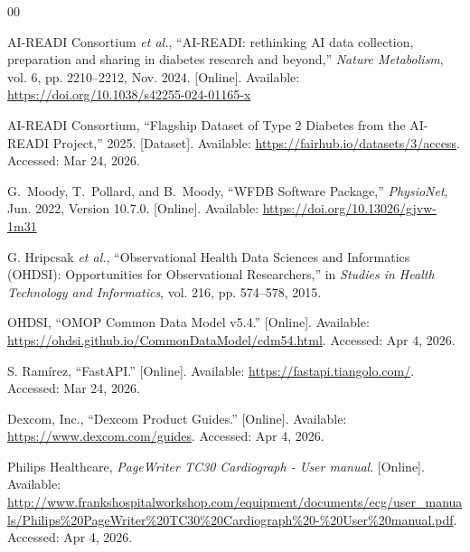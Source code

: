 \documentclass[conference]{IEEEtran}
\begin{document}
\begin{thebibliography}{00}

{AI-READI Consortium} \emph{et al.}, ``{AI}-{READI}: rethinking {AI} data collection, preparation and sharing in diabetes research and beyond,'' \emph{Nature Metabolism}, vol. 6, pp. 2210--2212, Nov. 2024. [Online]. Available: \url{https://doi.org/10.1038/s42255-024-01165-x}

{AI-READI Consortium}, ``Flagship Dataset of Type 2 Diabetes from the AI-READI Project,'' 2025. [Dataset]. Available: \url{https://fairhub.io/datasets/3/access}. Accessed: Mar 24, 2026.

G.~Moody, T.~Pollard, and B.~Moody, ``{WFDB} {Software} {Package},'' \emph{PhysioNet}, Jun. 2022, Version 10.7.0. [Online]. Available: \url{https://doi.org/10.13026/gjvw-1m31}

G. Hripcsak \emph{et al.}, ``Observational Health Data Sciences and Informatics (OHDSI): Opportunities for Observational Researchers,'' in \emph{Studies in Health Technology and Informatics}, vol. 216, pp. 574--578, 2015.

OHDSI, ``OMOP Common Data Model v5.4.'' [Online]. Available: \url{https://ohdsi.github.io/CommonDataModel/cdm54.html}. Accessed: Apr 4, 2026.

S. Ramírez, ``FastAPI.'' [Online]. Available: \url{https://fastapi.tiangolo.com/}. Accessed: Mar 24, 2026.

{Dexcom, Inc.}, ``Dexcom Product Guides.'' [Online]. Available: \url{https://www.dexcom.com/guides}. Accessed: Apr 4, 2026.

{Philips Healthcare}, \emph{PageWriter TC30 Cardiograph - User manual}. [Online]. Available: \url{http://www.frankshospitalworkshop.com/equipment/documents/ecg/user_manuals/Philips\%20PageWriter\%20TC30\%20Cardiograph\%20-\%20User\%20manual.pdf}. Accessed: Apr 4, 2026.

\end{thebibliography}
\end{document}
